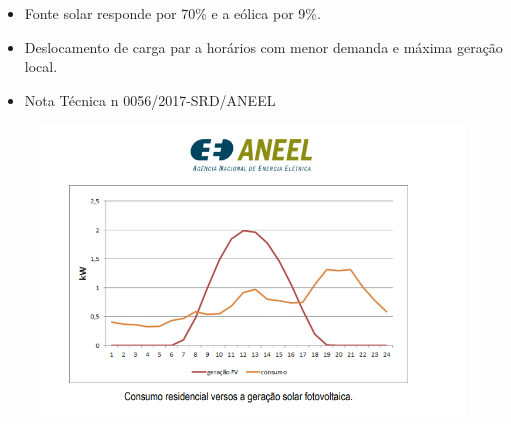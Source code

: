\begin{frame}
  \begin{block}{}
   \begin{itemize}
     \item Fonte solar responde por 70\% e a eólica por 9\%.
   \end{itemize}
  \end{block}
	\begin{figure}[!htb]
		\centering
		\quad %
	\end{figure}
\end{frame}

\begin{frame}
  \begin{block}{}
   \begin{itemize}
     \item Deslocamento de carga par a horários com menor demanda e máxima
       geração local.
     \item Nota Técnica n 0056/2017-SRD/ANEEL
   \end{itemize}
  \end{block}
  \begin{figure}[h]
  	\begin{center}
      \includegraphics [scale=0.3]{./Figures/t09}
  	\end{center}
  \end{figure}
\end{frame}

